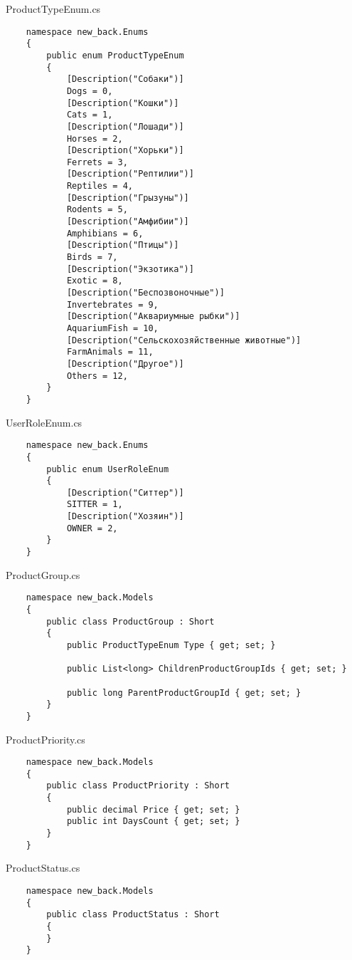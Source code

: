 ProductTypeEnum.cs
\lstset{style=sharpc}
\begin{lstlisting}
    namespace new_back.Enums
    {
        public enum ProductTypeEnum
        {
            [Description("Собаки")]
            Dogs = 0,
            [Description("Кошки")]
            Cats = 1,
            [Description("Лошади")]
            Horses = 2,
            [Description("Хорьки")]
            Ferrets = 3,
            [Description("Рептилии")]
            Reptiles = 4,
            [Description("Грызуны")]
            Rodents = 5,
            [Description("Амфибии")]
            Amphibians = 6,
            [Description("Птицы")]
            Birds = 7,
            [Description("Экзотика")]
            Exotic = 8,
            [Description("Беспозвоночные")]
            Invertebrates = 9,
            [Description("Аквариумные рыбки")]
            AquariumFish = 10,
            [Description("Сельскохозяйственные животные")]
            FarmAnimals = 11,
            [Description("Другое")]
            Others = 12,
        }
    }
\end{lstlisting}

UserRoleEnum.cs
\lstset{style=sharpc}
\begin{lstlisting}
    namespace new_back.Enums
    {
        public enum UserRoleEnum
        {
            [Description("Ситтер")]
            SITTER = 1,
            [Description("Хозяин")]
            OWNER = 2,
        }
    }
\end{lstlisting}

ProductGroup.cs
\lstset{style=sharpc}
\begin{lstlisting}
    namespace new_back.Models
    {
        public class ProductGroup : Short
        {
            public ProductTypeEnum Type { get; set; }
            
            public List<long> ChildrenProductGroupIds { get; set; }
            
            public long ParentProductGroupId { get; set; }
        }
    }
\end{lstlisting}

ProductPriority.cs
\lstset{style=sharpc}
\begin{lstlisting}
    namespace new_back.Models
    {
        public class ProductPriority : Short
        {
            public decimal Price { get; set; }
            public int DaysCount { get; set; }
        }
    }
\end{lstlisting}

ProductStatus.cs
\lstset{style=sharpc}
\begin{lstlisting}
    namespace new_back.Models
    {
        public class ProductStatus : Short
        {
        }
    }
\end{lstlisting}


